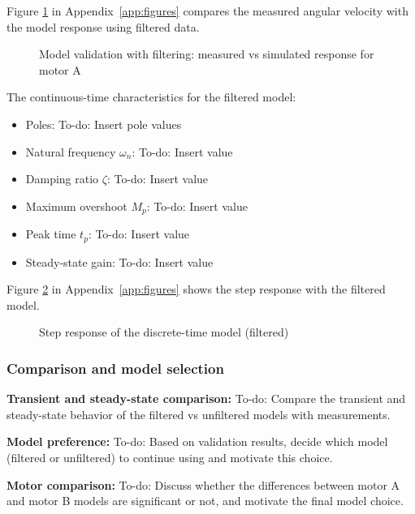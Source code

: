 \documentclass{article}
\begin{document}
	Figure \ref{fig:validation_filtered} in Appendix~\ref{app:figures} compares the measured angular velocity with the model response using filtered data.
	
	\begin{figure}[h]
		\centering
		\caption{Model validation with filtering: measured vs simulated response for motor A}
		\label{fig:validation_filtered}
	\end{figure}
	
	The continuous-time characteristics for the filtered model:
	\begin{itemize}
		\item Poles: To-do: Insert pole values
		\item Natural frequency $\omega_n$: To-do: Insert value
		\item Damping ratio $\zeta$: To-do: Insert value
		\item Maximum overshoot $M_p$: To-do: Insert value
		\item Peak time $t_p$: To-do: Insert value
		\item Steady-state gain: To-do: Insert value
	\end{itemize}
	
	Figure \ref{fig:step_filtered} in Appendix~\ref{app:figures} shows the step response with the filtered model.
	
	\begin{figure}[h]
		\centering
		\caption{Step response of the discrete-time model (filtered)}
		\label{fig:step_filtered}
	\end{figure}
	
	\subsubsection{Comparison and model selection}
	
	\textbf{Transient and steady-state comparison:} To-do: Compare the transient and steady-state behavior of the filtered vs unfiltered models with measurements.
	
	\textbf{Model preference:} To-do: Based on validation results, decide which model (filtered or unfiltered) to continue using and motivate this choice.
	
	\textbf{Motor comparison:} To-do: Discuss whether the differences between motor A and motor B models are significant or not, and motivate the final model choice.
	
\end{document}
